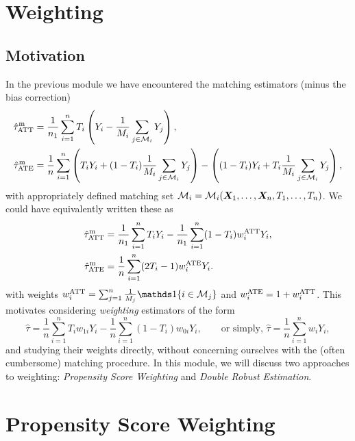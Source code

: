 \documentclass[11pt]{exam}
\begin{document}

\begingroup\small

\section{Weighting}
\subsection{Motivation}
In the previous module we have encountered the matching estimators (minus the bias correction)
\begin{align*}
    \hat \tau^\mathrm{m}_{\mathrm{ATT}} &= \frac{1}{n_1} \sum_{i=1}^n  T_i \left(Y_i - \frac{1}{M_i} \sum_{j \in \mathcal{M}_i} Y_j \right),
    \\
    \hat \tau^\mathrm{m}_{\mathrm{ATE}} &= \frac{1}{n} \sum_{i=1}^n \left(T_i Y_i + (1 - T_i) \frac{1}{M_i} \sum_{j \in \mathcal{M}_i} Y_j\right) - \left((1-T_i) Y_i + T_i \frac{1}{M_i} \sum_{j \in \mathcal{M}_i} Y_j\right),
\end{align*}
with appropriately defined matching set $\mathcal{M}_i = \mathcal{M}_i(\bm{X}_1, \ldots, \bm{X}_n, T_1, \ldots, T_n)$. 
We could have equivalently written these as
\begin{align*}
    \hat \tau^\mathrm{m}_{\mathrm{ATT}} &=  \frac{1}{n_1} \sum_{i=1}^n T_i Y_i - \frac{1}{n_1}\sum_{i=1}^n (1 - T_i) w^{\mathrm{ATT}}_i Y_i,
    \\
    \hat \tau^\mathrm{m}_{\mathrm{ATE}} &= \frac{1}{n} \sum_{i=1}^n (2T_i - 1) w^{\mathrm{ATE}}_i Y_i.
\end{align*}
with weights $w^{\ATT}_i = \sum_{j=1}^n \frac{1}{M_j}\indicator{i \in \mathcal{M}_j} $ and $w^{\mathrm{ATE}}_i = 1 + w^{\mathrm{ATT}}_i$. This motivates considering \emph{weighting} estimators of the form
\[
    \hat \tau = \frac{1}{n} \sum_{i=1}^n T_i w_{1i} Y_i -  \frac{1}{n} \sum_{i=1}^n (1-T_i) w_{0i} Y_i, \qquad \text{or simply,  } \hat \tau = \frac{1}{n} \sum_{i=1}^n w_i Y_i,
\]
and studying their weights directly, without concerning ourselves with the (often cumbersome) matching procedure.
In this module, we will discuss two approaches to weighting: \emph{Propensity Score Weighting} and \emph{Double Robust Estimation}.

\section{Propensity Score Weighting}
\end{document}
